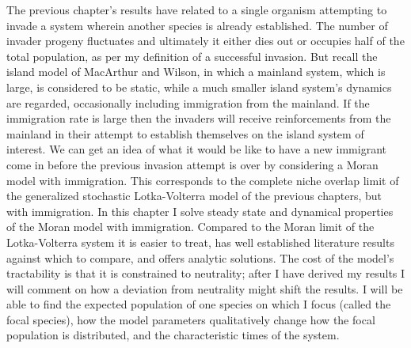 The previous chapter's results have related to a single organism attempting to invade a system wherein another species is already established. 
The number of invader progeny fluctuates and ultimately it either dies out or occupies half of the total population, as per my definition of a successful invasion. 
But recall the island model of MacArthur and Wilson, in which a mainland system, which is large, is considered to be static, while a much smaller island system's dynamics are regarded, occasionally including immigration from the mainland. 
If the immigration rate is large then the invaders will receive reinforcements from the mainland in their attempt to establish themselves on the island system of interest. 
We can get an idea of what it would be like to have a new immigrant come in before the previous invasion attempt is over by considering a Moran model with immigration.
This corresponds to the complete niche overlap limit of the generalized stochastic Lotka-Volterra model of the previous chapters, but with immigration. 
In this chapter I solve steady state and dynamical properties of the Moran model with immigration. 
Compared to the Moran limit of the Lotka-Volterra system it is easier to treat, has well established literature results against which to compare, and offers analytic solutions. 
The cost of the model's tractability is that it is constrained to neutrality; after I have derived my results I will comment on how a deviation from neutrality might shift the results. 
I will be able to find the expected population of one species on which I focus (called the focal species), how the model parameters qualitatively change how the focal population is distributed, and the characteristic times of the system. 

